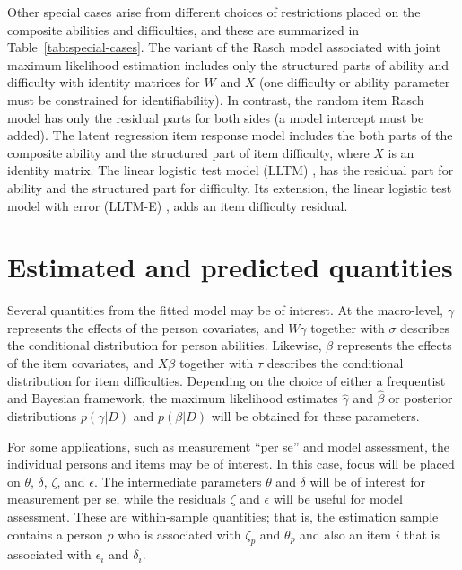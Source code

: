 \documentclass[12pt, letterpaper]{article}
\begin{document}
Other special cases arise from different choices of restrictions placed on the composite abilities and difficulties, and these are summarized in Table~\ref{tab:special-cases}. The variant of the Rasch model associated with joint maximum likelihood estimation \parencite[e.g.,]{embretson2000item} includes only the structured parts of ability and difficulty with identity matrices for $W$ and $X$ (one difficulty or ability parameter must be constrained for identifiability). In contrast, the random item Rasch model \parencite[e.g.,]{DeBoeck2008} has only the residual parts for both sides (a model intercept must be added). The latent regression item response model \parencite{Mislevy1985, Adams1997b} includes the both parts of the composite ability and the structured part of item difficulty, where $X$ is an identity matrix. The linear logistic test model (LLTM) \parencite{Fischer1973}, has the residual part for ability and the structured part for difficulty. Its extension, the linear logistic test model with error (LLTM-E) \parencite[e.g.,]{mislevy1988exploiting, Janssen2004}, adds an item difficulty residual. 


\section{Estimated and predicted quantities}

Several quantities from the fitted model may be of interest. At the macro-level, $\gamma$ represents the effects of the person covariates, and $W \gamma$ together with $\sigma$ describes the conditional distribution for person abilities. Likewise, $\beta$ represents the effects of the item covariates, and $X \beta$ together with $\tau$ describes the conditional distribution for item difficulties. Depending on the choice of either a frequentist and Bayesian framework, the maximum likelihood estimates $\hat \gamma$ and $\hat \beta$ or posterior distributions $p(\gamma | D)$ and $p(\beta | D)$ will be obtained for these parameters.

For some applications, such as measurement ``per se'' and model assessment, the individual persons and items may be of interest. In this case, focus will be placed on $\theta$, $\delta$, $\zeta$, and $\epsilon$. The intermediate parameters $\theta$ and $\delta$ will be of interest for measurement per se, while the residuals $\zeta$ and $\epsilon$ will be useful for model assessment. These are within-sample quantities; that is, the estimation sample contains a person $p$ who is associated with $\zeta_p$ and $\theta_p$ and also an item $i$ that is associated with $\epsilon_i$ and $\delta_i$. 
\end{document}
